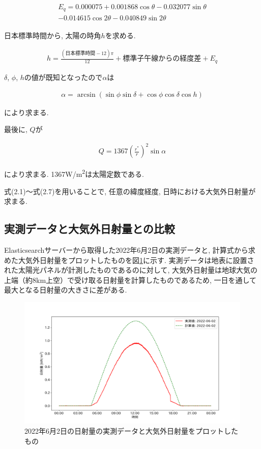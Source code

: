 \begin{eqnarray}
  \begin{split}
    E_q =  0.000075+0.001868\cos \theta-0.032077\sin \theta\\
    -0.014615\cos 2\theta-0.040849\sin 2\theta
  \end{split}
\end{eqnarray}

日本標準時間から, 太陽の時角$h$を求める.

\begin{eqnarray}
  h = \frac{(日本標準時間-12)\pi}{12}+標準子午線からの経度差+E_q
\end{eqnarray}

$\delta$, $\phi$, $h$の値が既知となったので$\alpha$は

\begin{eqnarray}
  \alpha = \arcsin (\sin \phi\sin \delta+\cos \phi\cos \delta\cos h)
\end{eqnarray}

により求まる.

最後に, $Q$が

\begin{eqnarray}
  Q = 1367(\frac{r^{*}}{r})^{2}\sin \alpha
\end{eqnarray}

により求まる. 1367\si{\watt}/\si{\metre\squared}は太陽定数である.

式(2.1)～式(2.7)を用いることで, 任意の緯度経度, 日時における大気外日射量が求まる.


\subsection{実測データと大気外日射量との比較}
Elasticsearchサーバーから取得した2022年6月2日の実測データと, 計算式から求めた大気外日射量をプロットしたものを図\ref{20220529-p1}に示す. 実測データは地表に設置された太陽光パネルが計測したものであるのに対して, 大気外日射量は地球大気の上端（約8km上空）で受け取る日射量を計算したものであるため, 一日を通して最大となる日射量の大きさに差がある.

\begin{figure}[H]
  \begin{center}
    \includegraphics[width=160mm]{sotu/figure/2/original-20220602-corr.png}
    \caption{2022年6月2日の日射量の実測データと大気外日射量をプロットしたもの}
    \label{20220529-p1}
  \end{center}
\end{figure}

